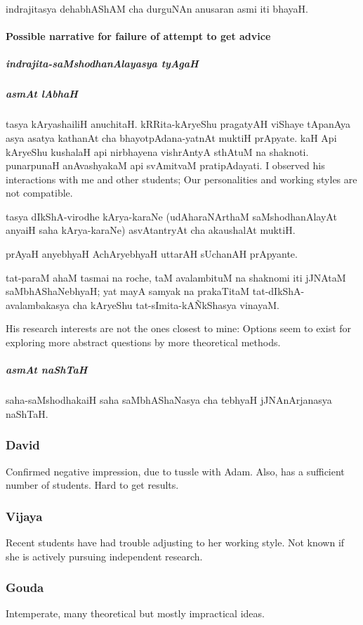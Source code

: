 \documentclass[oneside, article]{memoir}
\begin{document}
indrajitasya dehabhAShAM cha durguNAn anusaran asmi iti bhayaH.

\paragraph*{Possible narrative for failure of attempt to get advice}
\subparagraph{indrajita-saMshodhanAlayasya tyAgaH}
\subparagraph{asmAt lAbhaH}
tasya kAryashailiH anuchitaH. kRRita-kAryeShu pragatyAH viShaye tApanAya asya asatya kathanAt cha bhayotpAdana-yatnAt muktiH prApyate. kaH Api kAryeShu kushalaH api nirbhayena vishrAntyA sthAtuM na shaknoti. punarpunaH anAvashyakaM api svAmitvaM pratipAdayati. I observed his interactions with me and other students; Our personalities and working styles are not compatible.

tasya dIkShA-virodhe kArya-karaNe (udAharaNArthaM saMshodhanAlayAt anyaiH saha kArya-karaNe) asvAtantryAt cha akaushalAt muktiH.

prAyaH anyebhyaH AchAryebhyaH uttarAH sUchanAH prApyante.

tat-paraM ahaM tasmai na roche, taM avalambituM na shaknomi iti jJNAtaM saMbhAShaNebhyaH; yat mayA samyak na prakaTitaM tat-dIkShA-avalambakasya cha kAryeShu tat-sImita-kA\~NkShasya vinayaM.

His research interests are not the ones closest to mine: Options seem to exist for exploring more abstract questions by more theoretical methods.

\subparagraph{asmAt naShTaH}
saha-saMshodhakaiH saha saMbhAShaNasya cha tebhyaH jJNAnArjanasya naShTaH.



\subsubsection{David}
Confirmed negative impression, due to tussle with Adam. Also, has a sufficient number of students. Hard to get results.

\subsubsection{Vijaya}
Recent students have had trouble adjusting to her working style. Not known if she is actively pursuing independent research.

\subsubsection{Gouda}
Intemperate, many theoretical but mostly impractical ideas.
\end{document}
